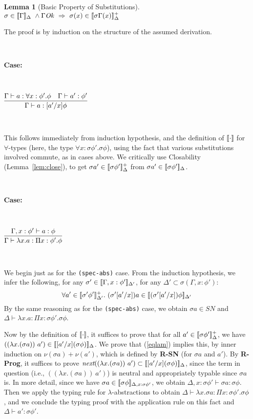 \documentclass[copyright]{eptcs}
\newtheorem{lemma}{Lemma}
\newcommand{\To}{\Rightarrow}
\newcommand{\next}[0]{\textit{next}}
\newcommand{\SN}[0]{\textit{SN}}
\newcommand{\interp}[1]{[\negthinspace[#1]\negthinspace]}
\begin{document}
\begin{lemma}[Basic Property of Substitutions]
\label{lem:substvars}
$\sigma\in\interp{\Gamma}_{\Delta}\ \land \Gamma \mathit{Ok}\ \To\ \sigma(x)\in \interp{\sigma \Gamma(x)}^+_{\Delta}$
\end{lemma}
\noindent The proof is by induction on the structure of the assumed
derivation.

\ 

\noindent \textbf{Case:}

\

$\infer{\Gamma \vdash a : [a'/x]\phi}{\Gamma \vdash a:\forall x:\phi'.\phi & \Gamma \vdash a':\phi'}$

\ 

\noindent This follows immediately from induction hypothesis, and the
definition of $\interp{\cdot}$ for $\forall$-types (here, the type
$\forall x:\sigma \phi'.\sigma \phi$), using the fact that various
substitutions involved commute, as in cases above.  We critically use
Closability (Lemma~\ref{lem:close}), to get $\sigma
a'\in\interp{\sigma\phi'}^+_\Delta$ from $\sigma
a'\in\interp{\sigma\phi'}_\Delta$.

\ 

\noindent \textbf{Case:}

\

$\infer{\Gamma \vdash \lambda x.a : \Pi x:\phi'.\phi}
      {\Gamma, x:\phi' \vdash a:\phi}$

\ 

\noindent We begin just as for the \texttt{(spec-abs)} case.  From the
induction hypothesis, we infer the following, for any
$\sigma'\in\interp{\Gamma,x:\phi'}_{\Delta'}$, for any
$\Delta'\subset\sigma (\Gamma,x:\phi')$:
\begin{equation}
\label{eqlam}
\forall a'\in\interp{\sigma' \phi'}^+_{\Delta'}.\ (\sigma'[a'/x]) a\in\interp{(\sigma'[a'/x])\phi}_{\Delta'}
\end{equation}
\noindent By the same reasoning as for the \texttt{(spec-abs)} case,
we obtain $\sigma a\in\SN$ and $\Delta\vdash \lambda x.a : \Pi
x:\sigma \phi'.\sigma \phi$.

Now by the definition of $\interp{\cdot}$, it suffices to prove that
for all $a'\in\interp{\sigma\phi'}^+_{\Delta}$, we have $((\lambda
x.(\sigma a))\ a') \in \interp{[a'/x](\sigma \phi)}_{\Delta}$.  We
prove that (\ref{eqlam}) implies this, by inner induction on
$\nu(\sigma a)+\nu(a')$, which is defined by \textbf{R-SN} (for
$\sigma a$ and $a'$).  By \textbf{R-Prog}, it suffices to prove
$\next((\lambda x.(\sigma a))\ a') \subset
\interp{[a'/x](\sigma\phi)}_{\Delta}$, since the term in question
(i.e., $((\lambda x.(\sigma a))\ a')$) is neutral and appropriately
typable since $\sigma a$ is.  In more detail, since we have $\sigma
a\in\interp{\sigma \phi}_{\Delta,x:\sigma\phi'}$, we obtain
$\Delta,x:\sigma\phi'\vdash \sigma a:\sigma \phi$.  Then we apply the
typing rule for $\lambda$-abstractions to obtain $\Delta\vdash \lambda
x.\sigma a:\Pi x:\sigma\phi'.\sigma \phi$, and we conclude the typing
proof with the application rule on this fact and $\Delta\vdash
a':\sigma\phi'$.
\end{document}
